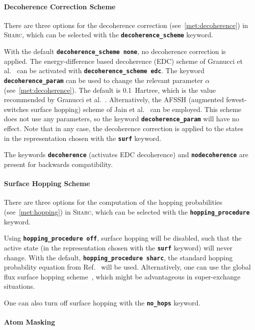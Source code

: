 \documentclass[a4paper,10pt,DIV=15,openany]{scrbook}
\newcommand{\sharc}{\textsc{Sharc}}
\newcommand{\ttt}[1]{\textbf{\texttt{#1}}}
\begin{document}
\paragraph{Decoherence Correction Scheme}

There are three options for the decoherence correction (see~\ref{met:decoherence}) in \sharc, which can be selected with the \ttt{decoherence\_scheme} keyword. 

With the default \ttt{decoherence\_scheme none}, no decoherence correction is applied.
The energy-difference based decoherence (EDC) scheme of Granucci et al.~\cite{Granucci2010JCP} can be activated with \ttt{decoherence\_scheme edc}. 
The keyword \ttt{decoherence\_param} can be used to change the relevant parameter $\alpha$ (see~\ref{met:decoherence}). The default is 0.1~Hartree, which is the value recommended by Granucci et al.~\cite{Granucci2010JCP}.
Alternatively, the AFSSH (augmented fewest-switches surface hopping) scheme of Jain et al.~\cite{Jain2016JCTC} can be employed. This scheme does not use any parameters, so the keyword \ttt{decoherence\_param} will have no effect.
Note that in any case, the decoherence correction is applied to the states in the representation chosen with the \ttt{surf} keyword.

The keywords \ttt{decoherence} (activates EDC decoherence) and \ttt{nodecoherence} are present for backwards compatibility.

\paragraph{Surface Hopping Scheme}

There are three options for the computation of the hopping probabilities (see~\ref{met:hopping}) in \sharc, which can be selected with the \ttt{hopping\_procedure} keyword. 

Using \ttt{hopping\_procedure off}, surface hopping will be disabled, such that the active state (in the representation chosen with the \ttt{surf} keyword) will never change.
With the default, \ttt{hopping\_procedure sharc}, the standard hopping probability equation from Ref.~\cite{Mai2015IJQC} will be used.
Alternatively, one can use the global flux surface hopping scheme~\cite{Wang2014JCTC}, which might be advantageous in super-exchange situations.

One can also turn off surface hopping with the \ttt{no\_hops} keyword.

\paragraph{Atom Masking}
\end{document}

